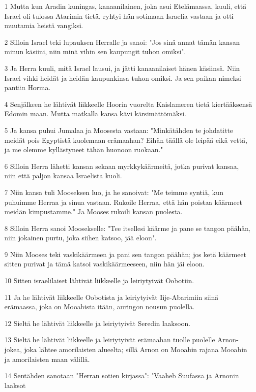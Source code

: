 \par 1 Mutta kun Aradin kuningas, kanaanilainen, joka asui Etelämaassa, kuuli, että Israel oli tulossa Atarimin tietä, ryhtyi hän sotimaan Israelia vastaan ja otti muutamia heistä vangiksi.
\par 2 Silloin Israel teki lupauksen Herralle ja sanoi: "Jos sinä annat tämän kansan minun käsiini, niin minä vihin sen kaupungit tuhon omiksi".
\par 3 Ja Herra kuuli, mitä Israel lausui, ja jätti kanaanilaiset hänen käsiinsä. Niin Israel vihki heidät ja heidän kaupunkinsa tuhon omiksi. Ja sen paikan nimeksi pantiin Horma.
\par 4 Senjälkeen he lähtivät liikkeelle Hoorin vuorelta Kaislameren tietä kiertääksensä Edomin maan. Mutta matkalla kansa kävi kärsimättömäksi.
\par 5 Ja kansa puhui Jumalaa ja Moosesta vastaan: "Minkätähden te johdatitte meidät pois Egyptistä kuolemaan erämaahan? Eihän täällä ole leipää eikä vettä, ja me olemme kyllästyneet tähän huonoon ruokaan."
\par 6 Silloin Herra lähetti kansan sekaan myrkkykäärmeitä, jotka purivat kansaa, niin että paljon kansaa Israelista kuoli.
\par 7 Niin kansa tuli Mooseksen luo, ja he sanoivat: "Me teimme syntiä, kun puhuimme Herraa ja sinua vastaan. Rukoile Herraa, että hän poistaa käärmeet meidän kimpustamme." Ja Mooses rukoili kansan puolesta.
\par 8 Silloin Herra sanoi Moosekselle: "Tee itsellesi käärme ja pane se tangon päähän, niin jokainen purtu, joka siihen katsoo, jää eloon".
\par 9 Niin Mooses teki vaskikäärmeen ja pani sen tangon päähän; jos ketä käärmeet sitten purivat ja tämä katsoi vaskikäärmeeseen, niin hän jäi eloon.
\par 10 Sitten israelilaiset lähtivät liikkeelle ja leiriytyivät Oobotiin.
\par 11 Ja he lähtivät liikkeelle Oobotista ja leiriytyivät Iije-Abarimiin siinä erämaassa, joka on Mooabista itään, auringon nousun puolella.
\par 12 Sieltä he lähtivät liikkeelle ja leiriytyivät Seredin laaksoon.
\par 13 Sieltä he lähtivät liikkeelle ja leiriytyivät erämaahan tuolle puolelle Arnon-jokea, joka lähtee amorilaisten alueelta; sillä Arnon on Mooabin rajana Mooabin ja amorilaisten maan välillä.
\par 14 Sentähden sanotaan "Herran sotien kirjassa": "Vaaheb Suufassa ja Arnonin laaksot
